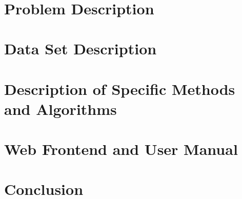 \documentclass[12pt]%
{article}
\begin{document}
\begin{titlepage}

\end{titlepage}

\newpage\thispagestyle{empty}~ %
\newpage 

\begin{abstract}

\end{abstract}

\newpage

\tableofcontents

\newpage

\section{Problem Description}
\label{sec:problem_description}


\section{Data Set Description}
\label{sec:data_description}


\section{Description of Specific Methods and Algorithms}
\label{sec:method}


\section{Web Frontend and User Manual}
\label{sec:frontend_description}


\section{Conclusion}


\newpage

\printglossary[style=altlist,title=Glossary]
 
\printglossary[type=\acronymtype,style=long]
 
\printglossary[type=symbolslist,style=long]

\newpage



\end{document}

